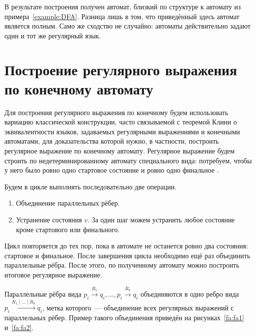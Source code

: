 В результате построения получен автомат, близкий по структуре к автомату из примера~\ref{example:DFA}.
Разница лишь в том, что приведённый здесь автомат является полным.
Само же сходство не случайно: автоматы действительно задают один и тот же регулярный язык.

\section{Построение регулярного выражения по конечному автомату}

Для построения регулярного выражения по конечному будем использовать вариацию классической конструкции, часто связываемой с теоремой Клини о эквивалентности языков, задаваемых регулярными выражениями и конечными автоматами, для доказательства которой нужно, в частности, построить регулярное выражение по конечному автомату.
Регулярное выражение будем строить по недетерминированному автомату специального вида: потребуем, чтобы у него было ровно одно стартовое состояние и ровно одно финальное%
.

Будем в цикле выполнять последовательно две операции.
\begin{enumerate}
    \item Объединение параллельных рёбер.
    \item Устранение состояния $v$. За один шаг можем устранить любое состояние кроме стартового или финального.
\end{enumerate}
Цикл повторяется до тех пор, пока в автомате не останется ровно два состояния: стартовое и финальное.
После завершения цикла необходимо ещё раз объединить параллельные рёбра.
После этого, по полученному автомату можно построить итоговое регулярное выражение.

Параллельные рёбра вида $p_i \xrightarrow{R_1} q_i, \ldots, p_i \xrightarrow{R_k} q_i$ объединяются в одно ребро вида $p_i \xrightarrow{R_1 \mid \ldots \mid R_k} q_i$, метка которого~--- объединение всех регулярных выражений с параллельных рёбер.
Пример такого объединения приведён на рисунках~\ref{fa:fa1} и~\ref{fa:fa2}.


